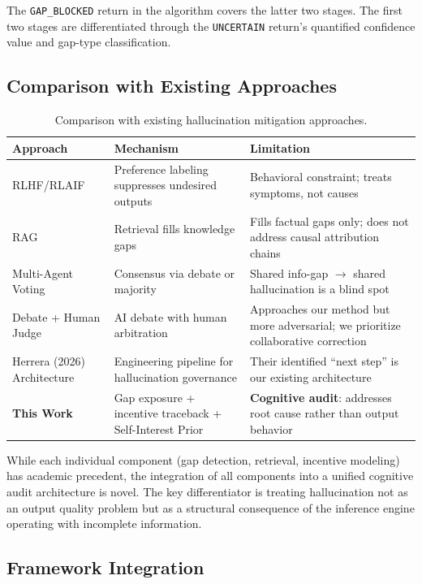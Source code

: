 The \texttt{GAP\_BLOCKED} return in the algorithm covers the latter two stages. 
The first two stages are differentiated through the \texttt{UNCERTAIN} return's 
quantified confidence value and gap-type classification.

\subsection{Comparison with Existing Approaches}

\begin{table}[ht]
\centering
\begin{tabular}{lp{}p{}}
\toprule
\textbf{Approach} & \textbf{Mechanism} & \textbf{Limitation} \\
\midrule
RLHF/RLAIF & Preference labeling suppresses undesired outputs & Behavioral constraint; treats symptoms, not causes \\
RAG & Retrieval fills knowledge gaps & Fills factual gaps only; does not address causal attribution chains \\
Multi-Agent Voting & Consensus via debate or majority & Shared info-gap $\rightarrow$ shared hallucination is a blind spot \\
Debate + Human Judge & AI debate with human arbitration & Approaches our method but more adversarial; we prioritize collaborative correction \\
Herrera (2026) Architecture & Engineering pipeline for hallucination governance & Their identified ``next step'' is our existing architecture \cite{herrera2026} \\
\midrule
\textbf{This Work} & Gap exposure + incentive traceback + Self-Interest Prior & \textbf{Cognitive audit}: addresses root cause rather than output behavior \\
\bottomrule
\end{tabular}
\caption{Comparison with existing hallucination mitigation approaches.}
\label{tab:comparison}
\end{table}

While each individual component (gap detection, retrieval, incentive modeling) 
has academic precedent, the integration of all components into a unified 
cognitive audit architecture is novel. The key differentiator is treating 
hallucination not as an output quality problem but as a structural consequence of 
the inference engine operating with incomplete information.

\subsection{Framework Integration}


